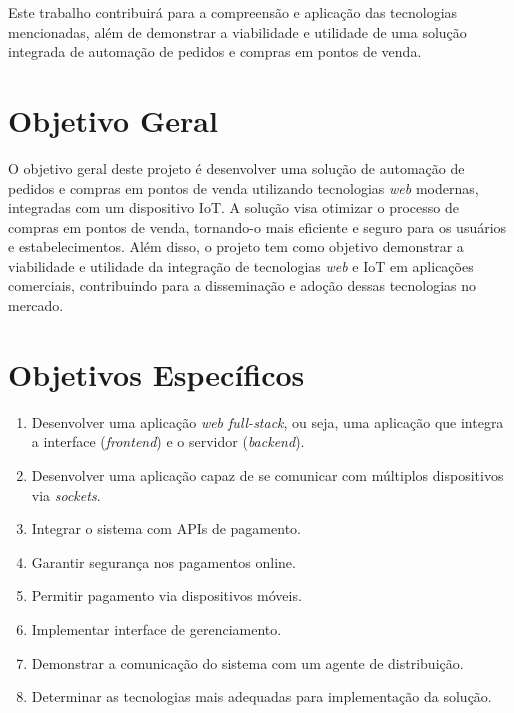 Este trabalho contribuirá para a compreensão e aplicação das tecnologias mencionadas, além de demonstrar a viabilidade e utilidade de uma solução integrada de automação de pedidos e compras em pontos de venda.

\section{Objetivo Geral}

O objetivo geral deste projeto é desenvolver uma solução de automação de pedidos e compras em pontos de venda utilizando tecnologias \textit{web} modernas, integradas com um dispositivo \gls{IoT}. A solução visa otimizar o processo de compras em pontos de venda, tornando-o mais eficiente e seguro para os usuários e estabelecimentos. Além disso, o projeto tem como objetivo demonstrar a viabilidade e utilidade da integração de tecnologias \textit{web} e \gls{IoT} em aplicações comerciais, contribuindo para a disseminação e adoção dessas tecnologias no mercado.

\section{Objetivos Específicos}

\begin{enumerate}

    \item Desenvolver uma aplicação \textit{web full-stack}, ou seja, uma aplicação que integra a interface (\textit{frontend}) e o servidor (\textit{backend}).

    \item Desenvolver uma aplicação capaz de se comunicar com múltiplos dispositivos via \textit{sockets}.
    
    \item Integrar o sistema com APIs de pagamento.
    
    \item Garantir segurança nos pagamentos online.

    \item Permitir pagamento via dispositivos móveis.

    \item Implementar interface de gerenciamento.

    \item Demonstrar a comunicação do sistema com um agente de distribuição.
    
    \item Determinar as tecnologias mais adequadas para implementação da solução.
    
\end{enumerate}


